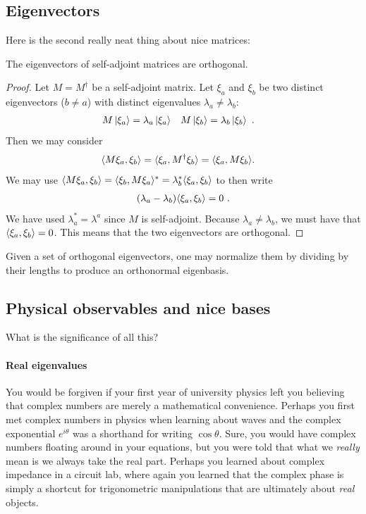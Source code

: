 \subsection{Eigenvectors}

Here is the second really neat thing about nice matrices:
\begin{theorem}
The eigenvectors of self-adjoint matrices are orthogonal.
\end{theorem}
\begin{proof}
Let $M=M^\dag$ be a self-adjoint matrix. Let $\xi_a$ and $\xi_b$ be two distinct eigenvectors ($b\neq a$) with distinct eigenvalues $\lambda_a \neq \lambda_b$:
\begin{align}
    M\left|\xi_a\right\rangle &= \lambda_a\left|\xi_a\right\rangle 
    &
    M\left|\xi_b\right\rangle &= \lambda_b\left|\xi_b\right\rangle 
    \ .
\end{align}
Then we may consider
\begin{align}
    \langle M \xi_a, \xi_b \rangle 
    &= 
    \langle \xi_a, M^\dag \xi_b \rangle 
    =
    \langle \xi_a, M \xi_b \rangle
    .
\end{align}
We may use $\langle M \xi_a, \xi_b \rangle = \langle \xi_b, M \xi_a \rangle^* = \lambda_b^*\langle \xi_a, \xi_b \rangle$ to then write
\begin{align}
    (\lambda_a - \lambda_b)\langle \xi_a,\xi_b\rangle = 0 \ .
\end{align}
We have used $\lambda_a^* = \lambda^a$ since $M$ is self-adjoint. Because $\lambda_a\neq \lambda_b$, we must have that $\langle \xi_a, \xi_b\rangle = 0$. This means that the two eigenvectors are orthogonal. 
\end{proof}
Given a set of orthogonal eigenvectors, one may normalize them by dividing by their lengths to produce an orthonormal eigenbasis. 

\subsection{Physical observables and nice bases}

What is the significance of all this? 

\paragraph{Real eigenvalues}
You would be forgiven if your first year of university physics left you believing that complex numbers are merely a mathematical convenience. Perhaps you first met complex numbers in physics when learning about waves and the complex exponential $e^{i\theta}$ was a shorthand for writing $\cos\theta$. Sure, you would have complex numbers floating around in your equations, but you were told that what we \emph{really} mean is we always take the real part. Perhaps you learned about complex impedance in a circuit lab, where again you learned that the complex phase is simply a shortcut for trigonometric manipulations that are ultimately about \emph{real} objects. 

